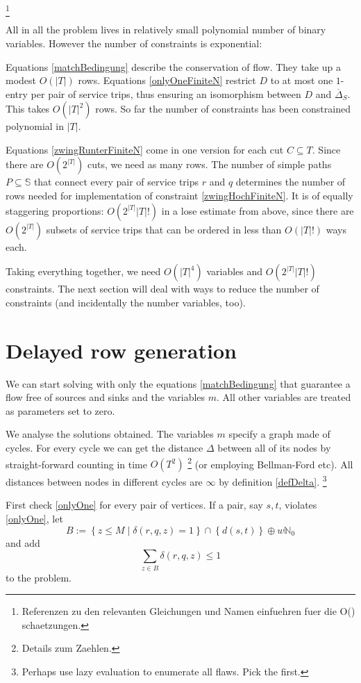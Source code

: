 \documentclass[a4paper]{amsart} %
\newcommand{\ol}[1]{\overline{#1}}
\newcommand{\todo}[1]{\footnote{#1}}
\newcommand{\abs}[1]{\ensuremath{\left|#1\right|}}
\newcommand{\lr}[1]{\ensuremath{\left( #1 \right)}}
\begin{document}
\todo{Referenzen zu den relevanten Gleichungen und Namen einfuehren
  fuer die O() schaetzungen.}

All in all the problem lives in relatively small polynomial number of
binary variables.  However the number of constraints is exponential:

Equations \ref{matchBedingung} describe the conservation of flow.
They take up a modest \(O\lr{\abs{T}}\) rows.  Equations
\ref{onlyOneFiniteN} restrict \(D\) to at most one \(1\)-entry per
pair of service trips, thus ensuring an isomorphism between \(D\) and
\(\ol{\Delta}_S\).  This takes \(O \lr{\abs{T}^2}\) rows.  So far the
number of constraints has been constrained polynomial in \(\abs{T}\).

Equations \ref{zwingRunterFiniteN} come in one version for each cut
\(C \subseteq T\).  Since there are \(O \lr{2^{\abs{T}}}\) cuts, we
need as many rows.  The number of simple paths \(P \subseteq
\mathbb{S}\) that connect every pair of service trips \(r\) and \(q\)
determines the number of rows needed for implementation of constraint
\ref{zwingHochFiniteN}.  It is of equally staggering proportions:
\(O\lr{2^{\abs{T}} \abs{T}!}\) in a lose estimate from above, since
there are \(O\lr{2^{\abs{T}}}\) subsets of service trips that can be
ordered in less than \(O \lr{\abs{T}!}\) ways each.

Taking everything together, we need \(O\lr{\abs{T}^4}\) variables and
\(O\lr{2^{\abs{T}} \abs{T}!}\) constraints.  The next section will
deal with ways to reduce the number of constraints (and incidentally
the number variables, too).

\section{Delayed row generation}
We can start solving with only the equations \ref{matchBedingung} that
guarantee a flow free of sources and sinks and the variables \(m\).
All other variables are treated as parameters set to zero.

We analyse the solutions obtained.  The variables \(m\) specify a
graph made of cycles.  For every cycle we can get the distance
\(\Delta\) between all of its nodes by straight-forward counting in
time \(O(T^2)\) \todo{Details zum Zaehlen.} (or employing Bellman-Ford
etc).  All distances between nodes in different cycles are \(\infty\)
by definition \ref{defDelta}.  \todo{Perhaps use lazy evaluation to enumerate
  all flaws.  Pick the first.}

First check \ref{onlyOne} for every pair of vertices.  If a pair, say
\(s,t\), violates \ref{onlyOne}, let 
\begin{equation}
B := \left\{z\leq M \mid
  \delta(r,q,z) = 1\right\} \cap {\left\{d (s,t)\right\} \oplus w
  \mathbb{N}_0}
\end{equation} and add
\begin{equation}
  \sum_{z \in B} \delta(r, q, z)  \leq 1
\end{equation}
to the problem.
  
\end{document}
